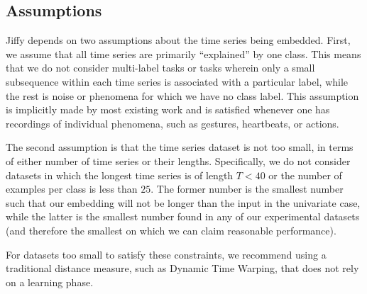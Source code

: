 \subsection{Assumptions}

Jiffy depends on two assumptions about the time series being embedded. First, we assume that all time series are primarily ``explained'' by one class. This means that we do not consider multi-label tasks or tasks wherein only a small subsequence within each time series is associated with a particular label, while the rest is noise or phenomena for which we have no class label. This assumption is implicitly made by  most existing work \citep{dataDicts} and is satisfied whenever one has recordings of individual phenomena, such as gestures, heartbeats, or actions. %


The second assumption is that the time series dataset is not too small, in terms of either number of time series or their lengths. Specifically, we do not consider datasets in which the longest time series is of length $T < 40$ or the number of examples per class is less than $25$. The former number is the smallest number such that our embedding will not be longer than the input in the univariate case, while the latter is the smallest number found in any of our experimental datasets (and therefore the smallest on which we can claim reasonable performance).

For datasets too small to satisfy these constraints, we recommend using a traditional distance measure, such as Dynamic Time Warping, that does not rely on a learning phase.





